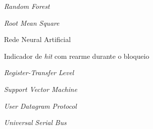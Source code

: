 \documentclass[
	12pt,				%
	oneside,
	a4paper,			%
	english,			%
	french,				%
	spanish,			%
	brazil				%
	]{abntex2}
\begin{document}
\begin{siglas}
	\item[\textbf{RF}] \textit{Random Forest}
	\item[\textbf{RMS}] \textit{Root Mean Square}
	\item[\textbf{RNA}] Rede Neural Artificial
	\item[\textbf{ROVL}] Indicador de \textit{hit} com rearme durante o bloqueio
	\item[\textbf{RTL}] \textit{Register-Transfer Level}
	\item[\textbf{SVM}] \textit{Support Vector Machine}
	\item[\textbf{UDP}] \textit{User Datagram Protocol}
	\item[\textbf{USB}] \textit{Universal Serial Bus}
\end{siglas}

\end{document}
